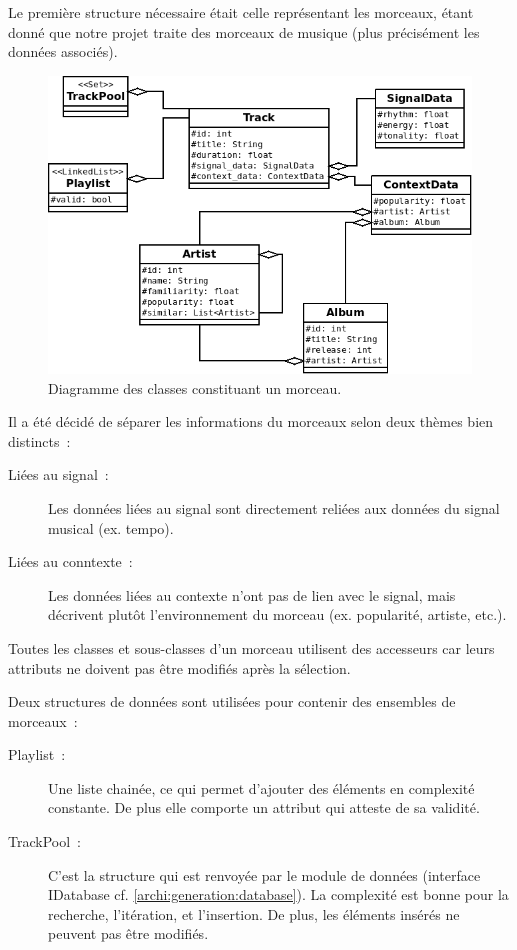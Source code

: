 Le première structure nécessaire était celle représentant les morceaux, étant 
donné que notre projet traite des morceaux de musique (plus précisément les 
données associés).

\begin{figure}[H]
\includegraphics[width=\textwidth]{data/archi/track.png}
\caption{Diagramme des classes constituant un morceau.}
\end{figure}

Il a été décidé de séparer les informations du morceaux selon deux thèmes bien
distincts~:
\begin{description}
  \item[Liées au signal~:] Les données liées au signal sont directement reliées
  aux données du signal musical (ex. tempo).
  \item[Liées au conntexte~:] Les données liées au contexte n'ont pas de 
  lien avec le signal, mais décrivent plutôt l'environnement du morceau 
  (ex. popularité, artiste, etc.).
\end{description}

Toutes les classes et sous-classes d'un morceau utilisent des accesseurs car 
leurs attributs ne doivent pas être modifiés après la sélection.

Deux structures de données sont utilisées pour contenir des ensembles de
morceaux~:
\begin{description}
  \item[Playlist~:] Une liste chainée, ce qui permet d'ajouter des éléments en
  complexité constante. De plus elle comporte un attribut qui atteste de sa validité.

  \item[TrackPool~:] C'est la structure qui est renvoyée par le module de 
  données (interface IDatabase cf. \ref{archi:generation:database}). La
  complexité est bonne pour la recherche, l’itération, et l'insertion. De plus,
  les éléments insérés ne peuvent pas être modifiés.
\end{description}

